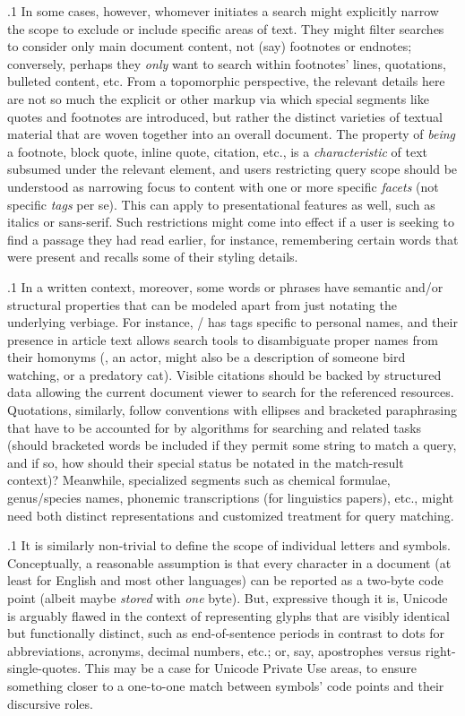\documentclass[11pt, twocolumn]{article}
\begin{document}
\p.1{%
In some cases, however, whomever initiates a search might
explicitly narrow the scope to exclude or include specific
areas of text. They might filter searches to consider
only main document content, not (say) footnotes or endnotes;
conversely, perhaps they \textit{only} want to search within
footnotes' lines, quotations, bulleted content, etc. From a topomorphic
perspective, the relevant details here are not so much
the explicit  or other markup via which special
segments like quotes and footnotes are introduced, but
rather the distinct varieties of textual material that
are woven together into an overall document. The property
of \textit{being} a footnote, block quote, inline quote, citation,
etc., is a \textit{characteristic} of text subsumed under the
relevant element, and users restricting query scope
should be understood as narrowing focus to content
with one or more specific \textit{facets} (not specific
\textit{tags} per se). This can apply to
presentational features as well, such as italics or sans-serif.
Such restrictions might come into effect if a user is seeking
to find a passage they had read earlier, for instance,
remembering certain words that were present and recalls
some of their styling details.
}%

\p.1{%
In a written context, moreover, some words or phrases have
semantic and/or structural properties that can be
modeled apart from just notating the underlying verbiage.
For instance, / has tags specific to personal
names, and their presence in article text allows
search tools to disambiguate proper names from their
homonyms (, an actor, might also be
a description of someone bird watching, or
a predatory cat). Visible citations
should be backed by structured data allowing the current
document viewer to search for the referenced resources.
Quotations, similarly, follow conventions with ellipses
and bracketed paraphrasing that have to be accounted
for by algorithms for searching and related tasks
(should bracketed words be included if they permit
some string to match a query, and if so, how
should their special status be notated in the match-result
context)? Meanwhile, specialized segments such as
chemical formulae, genus/species names, phonemic transcriptions (for linguistics
papers), etc., might need both distinct representations
and customized treatment for query matching.
}%

\p.1{%
It is similarly non-trivial to define the scope of
individual letters and symbols. Conceptually, a
reasonable assumption is that every character in a
document (at least for English and most other languages)
can be reported as a two-byte  code point
(albeit maybe \textit{stored} with \textit{one} byte).
But, expressive though it is, Unicode is arguably
flawed in the context of representing glyphs that
are visibly identical but functionally distinct,
such as end-of-sentence periods in contrast to
dots for abbreviations, acronyms, decimal numbers,
etc.; or, say, apostrophes versus
right-single-quotes. This may be a case for
Unicode Private Use areas, to ensure something
closer to a one-to-one match between symbols'
code points and their discursive roles.
}%
\end{document}
